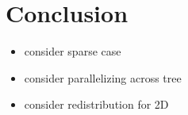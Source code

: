 \section{Conclusion}

\begin{itemize}
	\item consider sparse case
	\item consider parallelizing across tree
	\item consider redistribution for 2D
\end{itemize}

